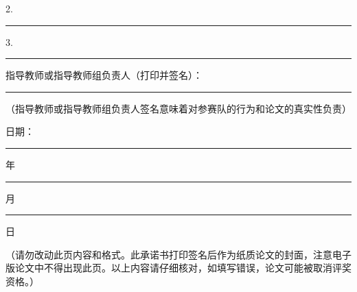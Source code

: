 {\vspace{0.10cm}
\noindent\hspace{7.1em}2.\rule{6.2cm}{0.4pt}

\vspace{0.10cm}
\noindent\hspace{7.1em}3.\rule{6.2cm}{0.4pt}

\vspace{0.10cm}
\noindent 指导教师或指导教师组负责人（打印并签名）：\rule{4.6cm}{0.4pt}

\vspace{0.1cm}
\noindent （指导教师或指导教师组负责人签名意味着对参赛队的行为和论文的真实性负责）

\vspace{0.22cm}
\begin{flushright}
  日期：\rule{1.8cm}{0.4pt} 年 \rule{1.2cm}{0.4pt} 月 \rule{1.2cm}{0.4pt} 日
\end{flushright}
}

\vspace{0.10cm}
{\color{red}（请勿改动此页内容和格式。此承诺书打印签名后作为纸质论文的封面，注意电子版论文中不得出现此页。以上内容请仔细核对，如填写错误，论文可能被取消评奖资格。）}

